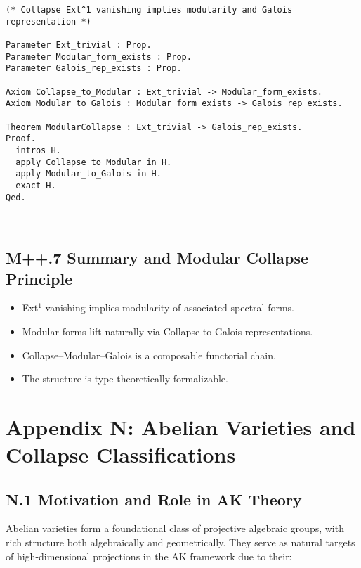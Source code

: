 \documentclass[11pt]{article}
\begin{document}
\begin{axiom}
\begin{axiom}
{{\begin{verbatim}
(* Collapse Ext^1 vanishing implies modularity and Galois representation *)

Parameter Ext_trivial : Prop.
Parameter Modular_form_exists : Prop.
Parameter Galois_rep_exists : Prop.

Axiom Collapse_to_Modular : Ext_trivial -> Modular_form_exists.
Axiom Modular_to_Galois : Modular_form_exists -> Galois_rep_exists.

Theorem ModularCollapse : Ext_trivial -> Galois_rep_exists.
Proof.
  intros H.
  apply Collapse_to_Modular in H.
  apply Modular_to_Galois in H.
  exact H.
Qed.
\end{verbatim}

---

\subsection*{M++.7 Summary and Modular Collapse Principle}

\begin{itemize}
  \item Ext$^1$-vanishing implies modularity of associated spectral forms.
  \item Modular forms lift naturally via Collapse to Galois representations.
  \item Collapse–Modular–Galois is a composable functorial chain.
  \item The structure is type-theoretically formalizable.
\end{itemize}

\begin{center}
\end{center}



\section*{Appendix N: Abelian Varieties and Collapse Classifications}

\subsection*{N.1 Motivation and Role in AK Theory}

Abelian varieties form a foundational class of projective algebraic groups, with rich structure both algebraically and geometrically.  
They serve as natural targets of high-dimensional projections in the AK framework due to their:

}}
\end{axiom}
\end{axiom}
\end{document}
